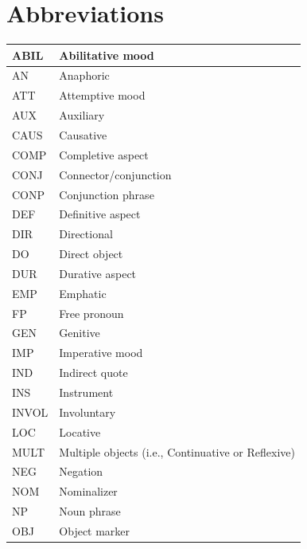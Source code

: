 \documentclass[10pt]{article}
\begin{document}
\section*{Abbreviations}
\begin{center}
\begin{tabular}{|l|l|}
\hline
ABIL & Abilitative mood \\
\hline
AN & Anaphoric \\
\hline
ATT & Attemptive mood \\
\hline
AUX & Auxiliary \\
\hline
CAUS & Causative \\
\hline
COMP & Completive aspect \\
\hline
CONJ & Connector/conjunction \\
\hline
CONP & Conjunction phrase \\
\hline
DEF & Definitive aspect \\
\hline
DIR & Directional \\
\hline
DO & Direct object \\
\hline
DUR & Durative aspect \\
\hline
EMP & Emphatic \\
\hline
FP & Free pronoun \\
\hline
GEN & Genitive \\
\hline
IMP & Imperative mood \\
\hline
IND & Indirect quote \\
\hline
INS & Instrument \\
\hline
INVOL & Involuntary \\
\hline
LOC & Locative \\
\hline
MULT & Multiple objects (i.e., Continuative or Reflexive) \\
\hline
NEG & Negation \\
\hline
NOM & Nominalizer \\
\hline
NP & Noun phrase \\
\hline
OBJ & Object marker \\
\hline
\end{tabular}
\end{center}
\end{document}
